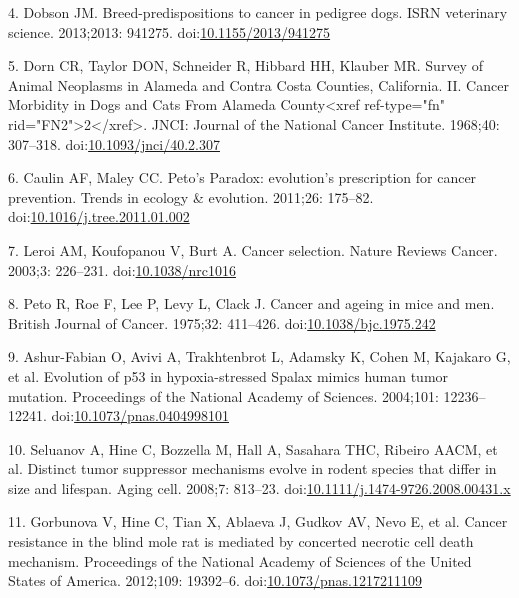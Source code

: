 \documentclass[]{elsarticle} %
\begin{document}
\leavevmode\hypertarget{ref-Dobson2013}{}%
4. Dobson JM. Breed-predispositions to cancer in pedigree dogs. ISRN veterinary science. 2013;2013: 941275. doi:\href{https://doi.org/10.1155/2013/941275}{10.1155/2013/941275}

\leavevmode\hypertarget{ref-Dorn1968}{}%
5. Dorn CR, Taylor DON, Schneider R, Hibbard HH, Klauber MR. Survey of Animal Neoplasms in Alameda and Contra Costa Counties, California. II. Cancer Morbidity in Dogs and Cats From Alameda County\textless{}xref ref-type="fn" rid="FN2"\textgreater{}2\textless{}/xref\textgreater{}. JNCI: Journal of the National Cancer Institute. 1968;40: 307--318. doi:\href{https://doi.org/10.1093/jnci/40.2.307}{10.1093/jnci/40.2.307}

\leavevmode\hypertarget{ref-Caulin2011}{}%
6. Caulin AF, Maley CC. Peto's Paradox: evolution's prescription for cancer prevention. Trends in ecology \& evolution. 2011;26: 175--82. doi:\href{https://doi.org/10.1016/j.tree.2011.01.002}{10.1016/j.tree.2011.01.002}

\leavevmode\hypertarget{ref-Leroi2003}{}%
7. Leroi AM, Koufopanou V, Burt A. Cancer selection. Nature Reviews Cancer. 2003;3: 226--231. doi:\href{https://doi.org/10.1038/nrc1016}{10.1038/nrc1016}

\leavevmode\hypertarget{ref-Peto1975}{}%
8. Peto R, Roe F, Lee P, Levy L, Clack J. Cancer and ageing in mice and men. British Journal of Cancer. 1975;32: 411--426. doi:\href{https://doi.org/10.1038/bjc.1975.242}{10.1038/bjc.1975.242}

\leavevmode\hypertarget{ref-Ashur-Fabian2004}{}%
9. Ashur-Fabian O, Avivi A, Trakhtenbrot L, Adamsky K, Cohen M, Kajakaro G, et al. Evolution of p53 in hypoxia-stressed Spalax mimics human tumor mutation. Proceedings of the National Academy of Sciences. 2004;101: 12236--12241. doi:\href{https://doi.org/10.1073/pnas.0404998101}{10.1073/pnas.0404998101}

\leavevmode\hypertarget{ref-Seluanov2008}{}%
10. Seluanov A, Hine C, Bozzella M, Hall A, Sasahara THC, Ribeiro AACM, et al. Distinct tumor suppressor mechanisms evolve in rodent species that differ in size and lifespan. Aging cell. 2008;7: 813--23. doi:\href{https://doi.org/10.1111/j.1474-9726.2008.00431.x}{10.1111/j.1474-9726.2008.00431.x}

\leavevmode\hypertarget{ref-Gorbunova2012}{}%
11. Gorbunova V, Hine C, Tian X, Ablaeva J, Gudkov AV, Nevo E, et al. Cancer resistance in the blind mole rat is mediated by concerted necrotic cell death mechanism. Proceedings of the National Academy of Sciences of the United States of America. 2012;109: 19392--6. doi:\href{https://doi.org/10.1073/pnas.1217211109}{10.1073/pnas.1217211109}
\end{document}

